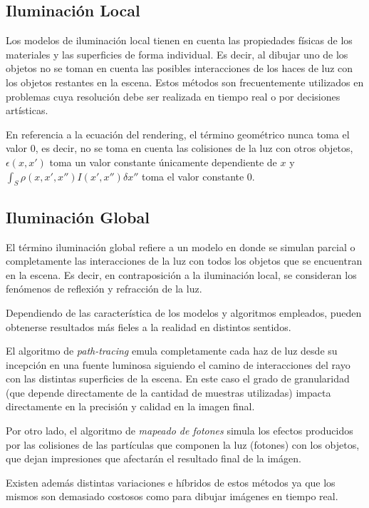\subsection{Iluminación Local}
\label{sec:ilumlocal}
Los modelos de iluminación local tienen en cuenta las propiedades físicas de los materiales
y las superficies de forma individual. Es decir, al dibujar uno de los objetos no se toman en cuenta las posibles interacciones de los haces de luz con los objetos restantes en la escena. Estos métodos son frecuentemente utilizados en problemas cuya resolución debe ser realizada en tiempo real o por decisiones artísticas.

En referencia a la ecuación del rendering, el término geométrico nunca toma el valor 0, es decir, no se toma en cuenta las colisiones de la luz con otros objetos, $\epsilon(x,x')$ toma un valor constante únicamente dependiente de $x$ y $\int_{S} \rho(x,x',x'')I(x',x'') \delta x''$ toma el valor constante $0$.

\subsection{Iluminación Global}
\label{sec:ilumglobal}

El término iluminación global refiere a un modelo en donde se simulan parcial o completamente las interacciones de la luz con todos los objetos que se encuentran  en la escena. Es decir, en contraposición a la iluminación local, se consideran los fenómenos de reflexión y refracción de la luz.

Dependiendo de las característica de los modelos y algoritmos empleados, pueden obtenerse resultados más fieles a la realidad en distintos sentidos.

El algoritmo de \textit{path-tracing} emula completamente cada haz de luz desde su incepción en una fuente luminosa siguiendo el camino de interacciones del rayo con las distintas superficies de la escena. En este caso el grado de granularidad (que depende directamente de la cantidad de muestras utilizadas) impacta directamente en la precisión y calidad en la imagen final.

Por otro lado, el algoritmo de \textit{mapeado de fotones} simula los efectos producidos por las colisiones de las partículas que componen la luz (fotones) con los objetos, que dejan impresiones que afectarán el resultado final de la imágen.

Existen además distintas variaciones e híbridos de estos métodos ya que los mismos son demasiado costosos como para dibujar imágenes en tiempo real.

